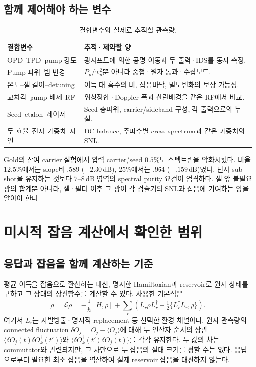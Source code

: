 \documentclass[11pt,a4paper]{article}
\newcommand{\dB}{\,\mathrm{dB}}
\newcommand{\ii}{\mathrm i}
\begin{document}
\subsection{함께 제어해야 하는 변수}
\begin{table}[htbp]\centering
\caption{결합변수와 실제로 추적할 관측량.}
\begin{tabularx}{\linewidth}{P{4.2cm}Y}
\toprule 결합변수 & 추적·제약할 양\\\midrule
OPD--TPD--pump 강도 & 광시프트에 의한 공명 이동과 두 출력·IDS를 동시 측정.\\
Pump 파워--빔 반경 & $P_p/w_p^2$뿐 아니라 중첩·원자 통과·수집모드.\\
온도--셀 길이--detuning & 이득 대 흡수의 비, 잡음바닥, 밀도변화의 보상 가능성.\\
교차각--pump 배제--RF & 위상정합·Doppler 폭과 산란배경을 같은 RF에서 비교.\\
Seed--etalon--레이저 & Seed 총파워, carrier/sideband 구성, 각 출력으로의 누설.\\
두 효율--전자 가중치--지연 & DC balance, 주파수별 cross spectrum과 같은 가중치의 SNL.\\
\bottomrule
\end{tabularx}
\end{table}

Gold의 잔여 carrier 실험에서 입력 carrier/seed $0.5\%$도 스펙트럼을
악화시켰다. 비율 $12.5\%$에서는 slope비 $.589$ ($-2.30\dB$),
$25\%$에서는 $.964$ ($-.159\dB$)였다\cite{sim}.
단지 sub-shot을 유지하는 것보다 $7$--$8\dB$ 영역의 spectral purity
요건이 엄격하다. 셀 앞 불필요 광의 합계뿐 아니라, 셀·필터 이후 그 광이
각 검출기의 SNL과 잡음에 기여하는 양을 알아야 한다.


\section{미시적 잡음 계산에서 확인한 범위}
\subsection{응답과 잡음을 함께 계산하는 기준}
평균 이득을 잡음으로 환산하는 대신, 명시한 Hamiltonian과 reservoir로
원자 상태를 구하고 그 상태의 상관함수를 계산할 수 있다. 사용한 기본식은
\begin{equation}
 \dot\rho=\mathcal L\rho=-\frac{\ii}{\hbar}[H,\rho]
 +\sum_r\left(L_r\rho L_r^\dagger-\tfrac12\{L_r^\dagger L_r,\rho\}\right).
\end{equation}
여기서 $L_r$는 자발방출·명시적 replacement 등 선택한 환경 채널이다.
원자 관측량의 connected fluctuation $\delta O_j=O_j-\langle O_j\rangle$에
대해 두 연산자 순서의 상관 $\langle\delta O_j(t)\delta O_k^\dagger(t')\rangle$와
$\langle\delta O_k^\dagger(t')\delta O_j(t)\rangle$를 각각 유지한다.
두 값의 차는 commutator와 관련되지만, 그 차만으로 두 잡음의 절대 크기를
정할 수는 없다. 응답으로부터 필요한 최소 잡음을 역산하여 실제 reservoir
잡음을 대신하지 않는다.
\end{document}
